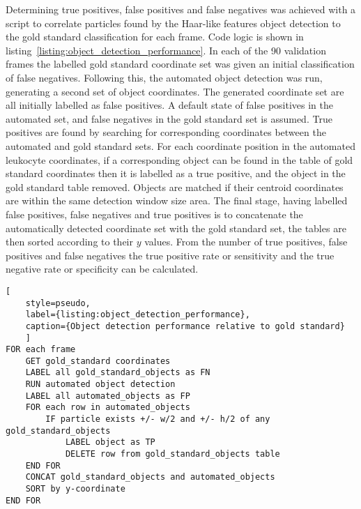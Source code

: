 Determining true positives, false positives and false negatives was achieved with a script to correlate particles found by the Haar-like features object detection to the gold standard classification for each frame. Code logic is shown in listing~\ref{listing:object_detection_performance}. In each of the 90 validation frames the labelled gold standard coordinate set was given an initial classification of false negatives. Following this, the automated object detection was run, generating a second set of object coordinates. The generated coordinate set are all initially labelled as false positives. A default state of false positives in the automated set, and false negatives in the gold standard set is assumed. True positives are found by searching for corresponding coordinates between the automated and gold standard sets. For each coordinate position in the automated leukocyte coordinates, if a corresponding object can be found in the table of gold standard coordinates then it is labelled as a true positive, and the object in the gold standard table removed. Objects are matched if their centroid coordinates are within the same detection window size area. The final stage, having labelled false positives, false negatives and true positives is to concatenate the automatically detected coordinate set with the gold standard set, the tables are then sorted according to their $y$ values. From the number of true positives, false positives and false negatives the true positive rate or sensitivity and the true negative rate or specificity can be calculated.

\begin{lstlisting}[
	style=pseudo,
	label={listing:object_detection_performance},
	caption={Object detection performance relative to gold standard}
	]
FOR each frame
	GET gold_standard coordinates
	LABEL all gold_standard_objects as FN
	RUN automated object detection
	LABEL all automated_objects as FP
	FOR each row in automated_objects
		IF particle exists +/- w/2 and +/- h/2 of any gold_standard_objects
			LABEL object as TP
			DELETE row from gold_standard_objects table
	END FOR
	CONCAT gold_standard_objects and automated_objects
	SORT by y-coordinate
END FOR
\end{lstlisting}

